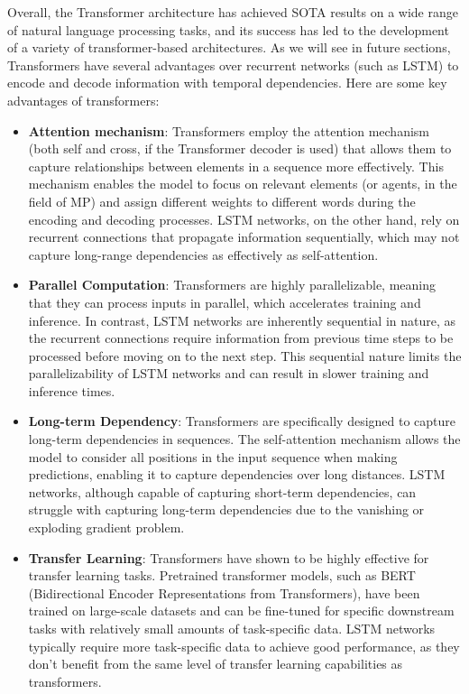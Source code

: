 Overall, the Transformer architecture has achieved \ac{SOTA} results on a wide range of natural language processing tasks, and its success has led to the development of a variety of transformer-based architectures. As we will see in future sections, Transformers have several advantages over recurrent networks (such as \ac{LSTM}) to encode and decode information with temporal dependencies. Here are some key advantages of transformers:

\begin{itemize}
	\item \textbf{Attention mechanism}: Transformers employ the attention mechanism (both self and cross, if the Transformer decoder is used) that allows them to capture relationships between elements in a sequence more effectively. This mechanism enables the model to focus on relevant elements (or agents, in the field of \ac{MP}) and assign different weights to different words during the encoding and decoding processes. \ac{LSTM} networks, on the other hand, rely on recurrent connections that propagate information sequentially, which may not capture long-range dependencies as effectively as self-attention.
	
	\item \textbf{Parallel Computation}: Transformers are highly parallelizable, meaning that they can process inputs in parallel, which accelerates training and inference. In contrast, \ac{LSTM} networks are inherently sequential in nature, as the recurrent connections require information from previous time steps to be processed before moving on to the next step. This sequential nature limits the parallelizability of LSTM networks and can result in slower training and inference times.
	
	\item \textbf{Long-term Dependency}: Transformers are specifically designed to capture long-term dependencies in sequences. The self-attention mechanism allows the model to consider all positions in the input sequence when making predictions, enabling it to capture dependencies over long distances. LSTM networks, although capable of capturing short-term dependencies, can struggle with capturing long-term dependencies due to the vanishing or exploding gradient problem.
	
	\item \textbf{Transfer Learning}: Transformers have shown to be highly effective for transfer learning tasks. Pretrained transformer models, such as BERT (Bidirectional Encoder Representations from Transformers), have been trained on large-scale datasets and can be fine-tuned for specific downstream tasks with relatively small amounts of task-specific data. \ac{LSTM} networks typically require more task-specific data to achieve good performance, as they don't benefit from the same level of transfer learning capabilities as transformers.
	

\end{itemize}
